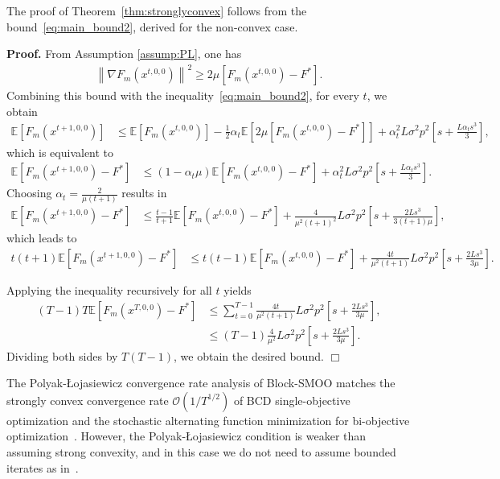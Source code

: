 \documentclass[11pt,a4paper]{article}
\numberwithin{equation}{section}%
\newenvironment{proof}[1][Proof]{\noindent \textbf{#1.} }{\hfill$\Box$\par\medskip}
\renewcommand{\(}{\left (}
\renewcommand{\)}{\right )}
\newcommand{\Lphif}{L}
\newcommand{\Fm}{F_m}
\begin{document}
The proof of Theorem~\ref{thm:stronglyconvex} follows from the bound~\eqref{eq:main_bound2}, derived for the non-convex case.
\vspace{\baselineskip}


\begin{proof}
From Assumption \ref{assump:PL}, one has
\begin{align*}
    \left\| \nabla \Fm(x^{t,0,0})  \right\|^2 \geq 2\mu [\Fm(x^{t,0,0}) - F^*].
\end{align*}
Combining this bound with the inequality~\eqref{eq:main_bound2}, for every $t$, we obtain
\begin{align*}
\mathbb{E} [\Fm(x^{t+1,0,0})]
&\leq \mathbb{E} [\Fm(x^{t,0,0})]  -\frac{1}{2} \alpha_t \mathbb{E} \left[2\mu [\Fm(x^{t,0,0}) - F^*]\right]   + \alpha_t^2 \Lphif \sigma^2 p^2\left[s + \frac{\Lphif \alpha_t  s^3}{3}\right],
\end{align*}
which is equivalent to 
\begin{align*}
\mathbb{E} [\Fm(x^{t+1,0,0})- F^*]
&\leq (1- \alpha_t \mu)\mathbb{E} [\Fm(x^{t,0,0}) - F^*]  + \alpha_t^2 \Lphif \sigma^2 p^2\left[s + \frac{\Lphif \alpha_t  s^3}{3}\right].
\end{align*}
Choosing $\alpha_t = \frac{2}{\mu (t+1)}$ results in
\begin{align*}
\mathbb{E} [\Fm(x^{t+1,0,0})- F^*]
&\leq \frac{t-1}{t+1}\mathbb{E} [\Fm(x^{t,0,0}) - F^*]  + \frac{4}{\mu^2 (t+1)^2} \Lphif \sigma^2 p^2\left[s + \frac{2\Lphif  s^3}{3(t+1)\mu }\right], 
\end{align*}
which leads to 
\begin{align*}
t(t+1)\mathbb{E} [\Fm(x^{t+1,0,0})- F^*]
&\leq t(t-1)\mathbb{E} [\Fm(x^{t,0,0}) - F^*]  + \frac{4t}{\mu^2 (t+1)} \Lphif \sigma^2 p^2\left[s + \frac{2\Lphif  s^3}{3\mu }\right].
\end{align*}

Applying the inequality recursively for all $t$ yields
\begin{align*}
(T-1)T\mathbb{E} [\Fm(x^{T,0,0})- F^*]
&\leq \sum_{t=0}^{T-1} \frac{4t}{\mu^2 (t+1)} \Lphif \sigma^2 p^2\left[s + \frac{2\Lphif  s^3}{3\mu }\right],\\
&\leq (T-1) \frac{4}{\mu^2} \Lphif \sigma^2 p^2\left[s + \frac{2\Lphif  s^3}{3\mu }\right].
\end{align*}
Dividing both sides by $T(T-1)$, we obtain the desired bound. 
\end{proof}
The Polyak-Łojasiewicz convergence rate analysis of Block-SMOO matches the strongly convex convergence rate $\mathcal{O}(1/T^{1/2})$ of BCD single-objective optimization \cite{ghadimi2013stochastic, xu2015blockstochasticgradientiteration} and the stochastic alternating function minimization for 
bi-objective optimization~\cite{SLiu_LNVicente_2019}. However, the Polyak-Łojasiewicz condition is weaker than assuming strong convexity, and in this case we do not need to assume bounded iterates as in~\cite{SLiu_LNVicente_2019}.
\end{document}
